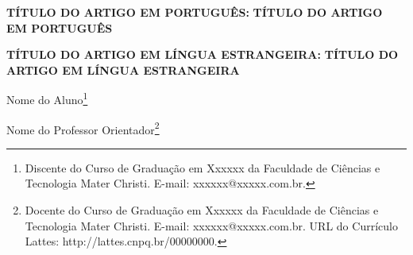 \newcommand{\TITULOP}{TÍTULO DO ARTIGO EM PORTUGUÊS}
\newcommand{\TITULOE}{TÍTULO DO ARTIGO EM LÍNGUA ESTRANGEIRA}
\newcommand{\AUTOR}{Nome do Aluno}
\newcommand{\AUTORCURRICULO}{Discente do Curso de Graduação em Xxxxxx da
Faculdade de Ciências e Tecnologia Mater Christi. E-mail: xxxxxx@xxxxx.com.br.}
\newcommand{\ORIENTADOR}{Nome do Professor Orientador}
\newcommand{\ORIENTADORCURRICULO}{Docente do Curso de Graduação em Xxxxxx da
Faculdade de Ciências e Tecnologia Mater Christi. E-mail: xxxxxx@xxxxx.com.br.
URL do Currículo Lattes: http://lattes.cnpq.br/00000000.}

\begin{onehalfspace}
  \begin{center}
    \ifdefined\SUBTITULOP
      \textbf{\TITULOP: \SUBTITULOP}
    \else
      \textbf{\TITULOP}
    \fi

    \bigskip

    \ifdefined\SUBTITULOE
      \textbf{\TITULOE: \SUBTITULOE}
    \else
      \textbf{\TITULOE}
    \fi
  \end{center}

  \bigskip

  \begin{flushright}
    \AUTOR\footnote{\AUTORCURRICULO}

    \ORIENTADOR\footnote{\ORIENTADORCURRICULO}
  \end{flushright}
\end{onehalfspace}
